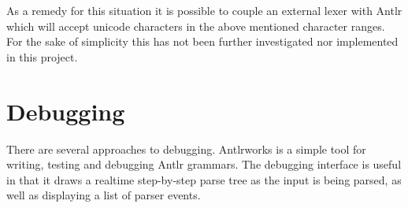As a remedy for this situation it is possible to couple an external lexer with
Antlr which will accept unicode characters in the above mentioned character
ranges. For the sake of simplicity this has not been further investigated nor
implemented in this project.

\section{Debugging}
There are several approaches to debugging. Antlrworks \cite{antlrwrks00} is a
simple tool for writing, testing and debugging Antlr grammars. The debugging
interface is useful in that it draws a realtime step-by-step parse tree as the
input is being parsed, as well as displaying a list of parser events.